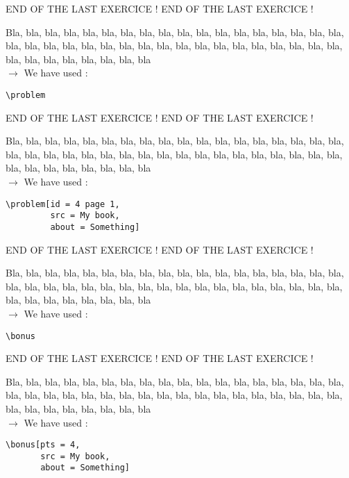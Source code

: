 \documentclass[12pt]{article}
\newcommand\blabla{%
		\noindent Bla, bla, bla, bla, bla, bla, bla, bla, bla, bla, bla,
		bla, bla, bla, bla, bla, bla, bla, bla, bla, bla, bla,
		bla, bla, bla, bla, bla, bla, bla, bla, bla, bla, bla,
		bla, bla, bla, bla, bla, bla, bla, bla, bla, bla, bla
	}
\newcommand\codeused{
		\blabla{} \medskip  \\ \noindent $\rightarrow$ We have used :
	}
\begin{document}
\newpage \medskip \noindent END OF THE LAST EXERCICE ! END OF THE LAST EXERCICE !

\problem

\codeused{}
\begin{verbatim}
\problem
\end{verbatim}


\newpage \medskip \noindent END OF THE LAST EXERCICE ! END OF THE LAST EXERCICE !

\problem[id = 4 page 1, src = My book, about = Something]

\codeused{}
\begin{verbatim}
\problem[id = 4 page 1, 
         src = My book, 
         about = Something]
\end{verbatim}




\newpage \medskip \noindent END OF THE LAST EXERCICE ! END OF THE LAST EXERCICE !

\bonus

\codeused{}
\begin{verbatim}
\bonus
\end{verbatim}



\newpage \medskip \noindent END OF THE LAST EXERCICE ! END OF THE LAST EXERCICE !

\bonus[pts = 4, src = My book, about = Something]

\codeused{}
\begin{verbatim}
\bonus[pts = 4, 
       src = My book, 
       about = Something]
\end{verbatim}
\end{document}
